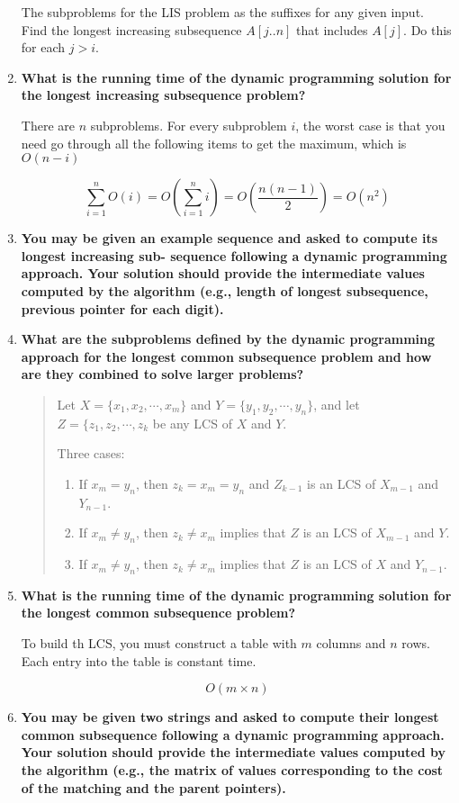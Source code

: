 \documentclass[a4paper,11pt]{article}
\begin{document}
\begin{enumerate}
  The subproblems for the LIS problem as the suffixes for any given
  input. Find the longest increasing subsequence $A[j..n]$ that includes
  $A[j]$. Do this for each $j > i$.
\item
  \textbf{What is the running time of the dynamic programming solution
  for the longest increasing subsequence problem?}

  There are $n$ subproblems. For every subproblem $i$, the worst case is
  that you need go through all the following items to get the maximum,
  which is $O(n - i)$

  \[\sum_{i=1}^n O(i) = O\left (\sum_{i=1}^n i \right ) = O\left ( \dfrac{n(n-1)}{2} \right ) = O(n^2)\]
\item
  \textbf{You may be given an example sequence and asked to compute its
  longest increasing sub- sequence following a dynamic programming
  approach. Your solution should provide the intermediate values
  computed by the algorithm (e.g., length of longest subsequence,
  previous pointer for each digit).}
\item
  \textbf{What are the subproblems defined by the dynamic programming
  approach for the longest common subsequence problem and how are they
  combined to solve larger problems?}

  \begin{quote}
  Let $X = \lbrace x_1, x_2, \cdots, x_m \rbrace$ and
  $Y = \lbrace y_1, y_2, \cdots, y_n \rbrace$, and let
  $Z = \lbrace z_1, z_2, \cdots, z_k$ be any LCS of $X$ and $Y$.

  Three cases:

  \begin{enumerate}
  \def\labelenumii{\arabic{enumii}.}
  \itemsep1pt\parskip0pt
  \item
    If $x_m = y_n$, then $z_k = x_m = y_n$ and $Z_{k - 1}$ is an LCS of
    $X_{m - 1}$ and $Y_{n - 1}$.
  \item
    If $x_m \not = y_n$, then $z_k \not = x_m$ implies that $Z$ is an
    LCS of $X_{m - 1}$ and $Y$.
  \item
    If $x_m \not = y_n$, then $z_k \not = x_m$ implies that $Z$ is an
    LCS of $X$ and $Y_{n - 1}$.
  \end{enumerate}
  \end{quote}
\item
  \textbf{What is the running time of the dynamic programming solution
  for the longest common subsequence problem?}

  To build th LCS, you must construct a table with $m$ columns and $n$
  rows. Each entry into the table is constant time.

  \[O(m \times n)\]
\item
  \textbf{You may be given two strings and asked to compute their
  longest common subsequence following a dynamic programming approach.
  Your solution should provide the intermediate values computed by the
  algorithm (e.g., the matrix of values corresponding to the cost of the
  matching and the parent pointers).}
\end{enumerate}
\end{document}
